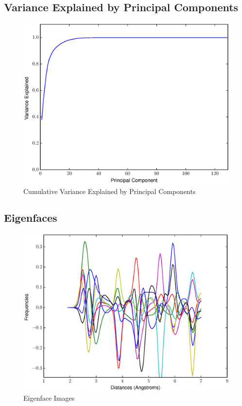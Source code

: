 \documentclass[12pt,letterpaper]{article}
\begin{document}
\subsection{Variance Explained by Principal Components}
\begin{figure}[ht]
  \begin{center}
    \includegraphics[scale=0.8]{figs/eigenfaces_varexplained.eps}
    \caption{Cumulative Variance Explained by Principal Components}
  \end{center}
\end{figure}
\clearpage

\subsection{Eigenfaces}
\begin{figure}[ht]
  \begin{center}
    \includegraphics[scale=0.8]{figs/eigenfaces.eps}
    \caption{Eigenface Images}
  \end{center}
\end{figure}
\clearpage
\end{document}
